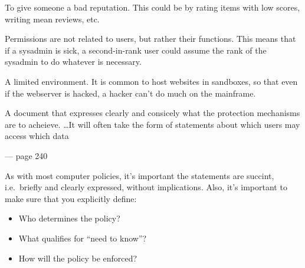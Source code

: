 \begin{definition}
    To give someone a bad reputation. This could be by rating items
    with low scores, writing mean reviews, etc.
\end{definition}

\begin{definition}
    Permissions are not related to users, but rather their functions. 
    This means that if a sysadmin is sick, a second-in-rank user could
    assume the rank of the sysadmin to do whatever is necessary.
\end{definition}

\begin{definition}[Sandbox]
    A limited environment. It is common to host websites in sandboxes,
    so that even if the webserver is hacked, a hacker can't do much on the
    mainframe.
\end{definition}


\begin{definition}\label{secpol}
\end{definition}



\begin{definition}[Secrecy]
\end{definition}

\begin{definition}

\end{definition}

\begin{definition}\label{secfunreq}
    
\end{definition}

    \epigraph{A document that expresses clearly and consicely what the 
    protection mechanisms are to acheieve. \dots It will often take the form of 
    statements about which users may access which data}{--- page 240}

    As with most computer policies, it's important the statements
    are succint, i.e.\ briefly and clearly expressed, without implications. 
    Also, it's important to make sure that you explicitly define:
    \begin{itemize}
        \item Who determines the policy?
        \item What qualifies for ``need to know''?
        \item How will the policy be enforced?
    \end{itemize}

